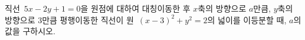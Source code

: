 직선~$5x-2y+1=0$을 원점에 대하여 대칭이동한 후 $x$축의 방향으로 $a$만큼, $y$축의 방향으로 $3$만큼 평행이동한 직선이 원~$(x-3)^2+y^2=2$의 넓이를 이등분할 때, $a$의 값을 구하시오.
